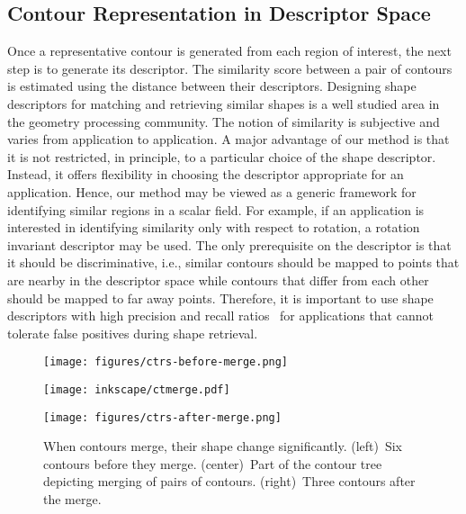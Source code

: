 \documentclass[review,journal]{vgtc}         %
\begin{document}
\subsection{Contour Representation in Descriptor Space}
Once a representative contour is generated from each region of interest, the next step
is to generate its descriptor. The similarity score between a pair of
contours is estimated using the distance between their descriptors.
Designing shape descriptors for matching and retrieving similar shapes is a well studied 
area in the geometry processing community. 
The notion of similarity is subjective and varies from application to application.
A major advantage of our method is that it is not restricted, in principle, to a particular choice
of the shape descriptor. Instead, it offers flexibility in choosing 
the descriptor appropriate for an application.  Hence, our method may be viewed as a generic framework for identifying
similar regions in a scalar field. For example, if an application is interested in 
identifying similarity only with respect to rotation, a rotation invariant descriptor may be used. 
The only prerequisite on the descriptor is that it should be discriminative, i.e., similar contours 
should be mapped to points that are nearby in the descriptor space while contours that differ 
from each other should be mapped to far away points. Therefore, it is important to use shape descriptors 
with high precision and recall ratios~\cite{lian2013} for applications that cannot tolerate false 
positives during shape retrieval.
\begin{figure}[b]
	\centering
	{
		\begin{minipage}[c][1\width]{0.3\linewidth}
		{
			\centering
			\texttt{[image: figures/ctrs-before-merge.png]}
		}
		\end{minipage}
	}
	{
		\begin{minipage}[c][1\width]{0.3\linewidth}
		{
			\centering
			\texttt{[image: inkscape/ctmerge.pdf]}
		}
		\end{minipage}
	}
	{
		\begin{minipage}[c][1\width]{0.3\linewidth}
		{
			\centering
			\texttt{[image: figures/ctrs-after-merge.png]}
		}
		\end{minipage}

	}
	\caption{\label{ct-merge}When contours merge, their shape change significantly. 
		(left)~Six contours before they merge. (center)~Part of the contour tree depicting
		merging of pairs of contours. (right)~Three contours after the merge.}
\end{figure}
\end{document}
